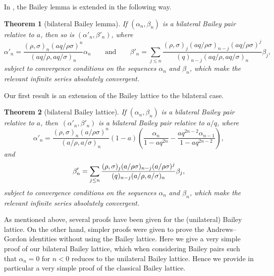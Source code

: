 \documentclass[pdftex]{sigma}
\numberwithin{equation}{section}
\newtheorem{Theorem}{Theorem}[section]
\begin{document}
In \cite{BMS}, the Bailey lemma is extended in the following way.
\begin{Theorem}[bilateral Bailey lemma]\label{thm:bilatbaileylemma}
If $(\alpha_n, \beta_n)$ is a bilateral Bailey pair relative to $a$, then
so is $(\alpha'_n, \beta'_n)$, where
\begin{equation*}\alpha'_n=\frac{(\rho,\sigma)_n(aq/\rho\sigma)^n}{
(aq/\rho,aq/\sigma)_n}\alpha_n\qquad\mbox{and}\qquad\beta'_n=\sum_{j\leq n}\frac{(\rho,\sigma)_j(aq/\rho\sigma)_{n-j}(aq/\rho\sigma)^j}{(q)_{n-j}(aq/\rho,aq/\sigma)_n}\beta_j,
\end{equation*}
subject to convergence conditions on the sequences $\alpha_n$ and $\beta_n$, which make the relevant infinite series absolutely convergent.
\end{Theorem}

Our first result is an extension of the Bailey lattice to the bilateral case.

\begin{Theorem}[bilateral Bailey lattice]\label{thm:bilatbaileylattice}
If $(\alpha_n, \beta_n)$ is a bilateral Bailey pair relative to $a$, then~$(\alpha'_n, \beta'_n)$ is a bilateral Bailey pair relative to $a/q$, where
\begin{equation*}\alpha'_n=\frac{(\rho,\sigma)_n(a/\rho\sigma)^n}{(a/\rho,a/\sigma)_n}(1-a)\left(\frac{\alpha_n}{1-aq^{2n}}-\frac{aq^{2n-2}\alpha_{n-1}}{1-aq^{2n-2}}\right),
\end{equation*}
and
\begin{equation*}\beta'_n=\sum_{j\leq n}{(\rho,\sigma)_j(a/\rho\sigma)_{n-j}(a/\rho\sigma)^j\over (q)_{n-j}(a/\rho,a/\sigma)_n} \beta_j,
\end{equation*}
subject to convergence conditions on the sequences $\alpha_n$ and $\beta_n$, which make the relevant infinite series absolutely convergent.
\end{Theorem}

As mentioned above, several proofs have been given for the (unilateral) Bailey lattice. On the other hand, simpler proofs were given to prove the Andrews--Gordon identities without using the Bailey lattice. Here we give a very simple proof of our bilateral Bailey lattice, which when considering Bailey pairs such that $\alpha_n=0$ for $n<0$ reduces to the unilateral Bailey lattice. Hence we provide in particular a very simple proof of the classical Bailey lattice.
\end{document}
